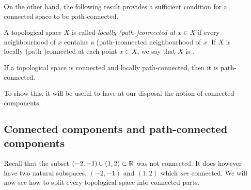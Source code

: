 On the other hand, the following result provides a sufficient condition for a connected space to be path-connected.
\begin{defn}
  A topological space $X$ is called \emph{locally (path-)connected at $x \in X$} if every neighbourhood of $x$ contains a (path-)connected neighbourhood of $x$. If $X$ is locally (path-)connected at each point $x \in X$, we say that $X$ is .
\end{defn}
\begin{thm}
  \label{path-connected-vs-connected}
  If a topological space is connected and locally path-connected, then it is path-connected.
\end{thm}
To show this, it will be useful to have at our disposal the notion of connected components.

\subsection{Connected components and path-connected components}
\label{component-section}
Recall that the subset $(-2,-1) \cup (1,2) \subset \mathbb{R}$ was not connected. It does however have two natural subspaces, $(-2,-1)$ and $(1,2)$ which \emph{are} connected. We will now see how to split every topological space into connected parts.

